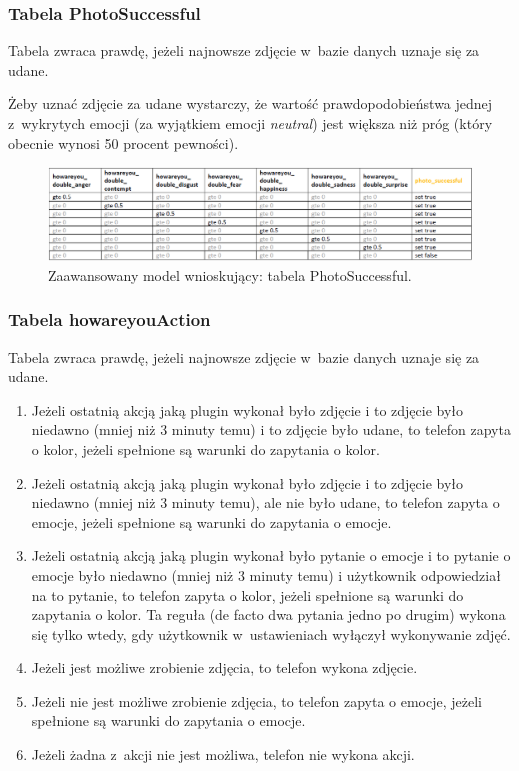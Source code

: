 \subsubsection{Tabela PhotoSuccessful}

Tabela zwraca prawdę, jeżeli najnowsze zdjęcie w~bazie danych uznaje się za udane.

Żeby uznać zdjęcie za udane wystarczy, że wartość prawdopodobieństwa jednej z~wykrytych emocji (za wyjątkiem emocji \textit{neutral}) jest większa niż próg (który obecnie wynosi 50 procent pewności).

\begin{figure}[H]
	\centering
	\includegraphics[scale=0.75]{rozdzial4/HMR_PhotoSuccessful.png}
	\caption{Zaawansowany model wnioskujący: tabela PhotoSuccessful.}
\end{figure}


\subsubsection{Tabela howareyouAction}

Tabela zwraca prawdę, jeżeli najnowsze zdjęcie w~bazie danych uznaje się za udane. 
\begin{enumerate}
	\item Jeżeli ostatnią akcją jaką plugin wykonał było zdjęcie i to zdjęcie było niedawno (mniej niż 3 minuty temu) i to zdjęcie było udane, to telefon zapyta o kolor, jeżeli spełnione są warunki do zapytania o kolor.
	\item Jeżeli ostatnią akcją jaką plugin wykonał było zdjęcie i to zdjęcie było niedawno (mniej niż 3 minuty temu), ale nie było udane, to telefon zapyta o emocje, jeżeli spełnione są warunki do zapytania o emocje.
	\item Jeżeli ostatnią akcją jaką plugin wykonał było pytanie o emocje i to pytanie o emocje było niedawno (mniej niż 3 minuty temu) i użytkownik odpowiedział na to pytanie, to telefon zapyta o kolor, jeżeli spełnione są warunki do zapytania o kolor. Ta reguła (de facto dwa pytania jedno po drugim) wykona się tylko wtedy, gdy użytkownik w~ustawieniach wyłączył wykonywanie zdjęć. 
	\item Jeżeli jest możliwe zrobienie zdjęcia, to telefon wykona zdjęcie. 
	\item Jeżeli nie jest możliwe zrobienie zdjęcia, to telefon zapyta o emocje, jeżeli spełnione są warunki do zapytania o emocje.
	\item Jeżeli żadna z~akcji nie jest możliwa, telefon nie wykona akcji.
\end{enumerate}

